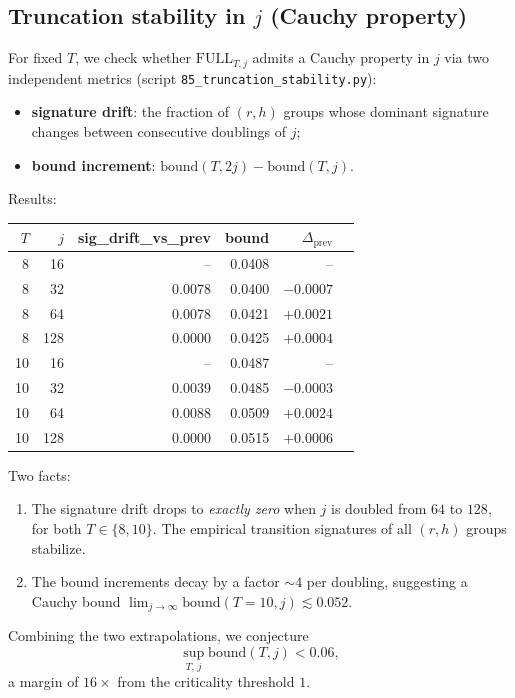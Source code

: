 \documentclass[11pt,a4paper]{article}
\theoremstyle{definition}
\newcommand{\full}{\mathrm{FULL}}
\begin{document}
\subsection{Truncation stability in $j$ (Cauchy property)}

For fixed $T$, we check whether $\full_{T, j}$ admits a Cauchy
property in $j$ via two independent metrics
(script \verb|85_truncation_stability.py|):
\begin{itemize}
  \item \textbf{signature drift}: the fraction of $(r, h)$ groups
        whose dominant signature changes between consecutive
        doublings of $j$;
  \item \textbf{bound increment}: $\mathrm{bound}(T, 2j) - \mathrm{bound}(T, j)$.
\end{itemize}

Results:

\begin{center}
\begin{tabular}{rrrrrr}
\toprule
$T$ & $j$ & sig\_drift\_vs\_prev & bound & $\Delta_{\mathrm{prev}}$ \\
\midrule
 8 & 16  & --     & 0.0408 & --      \\
 8 & 32  & 0.0078 & 0.0400 & $-0.0007$ \\
 8 & 64  & 0.0078 & 0.0421 & $+0.0021$ \\
 8 & 128 & 0.0000 & 0.0425 & $+0.0004$ \\
\midrule
10 & 16  & --     & 0.0487 & --      \\
10 & 32  & 0.0039 & 0.0485 & $-0.0003$ \\
10 & 64  & 0.0088 & 0.0509 & $+0.0024$ \\
10 & 128 & 0.0000 & 0.0515 & $+0.0006$ \\
\bottomrule
\end{tabular}
\end{center}

Two facts:
\begin{enumerate}
  \item The signature drift drops to \emph{exactly zero} when $j$ is
        doubled from $64$ to $128$, for both $T \in \{8, 10\}$. The
        empirical transition signatures of all $(r, h)$ groups
        stabilize.
  \item The bound increments decay by a factor $\sim 4$ per
        doubling, suggesting a Cauchy bound
        $\lim_{j\to\infty}\mathrm{bound}(T=10, j) \lesssim 0.052$.
\end{enumerate}
Combining the two extrapolations, we conjecture
\[
\sup_{T,\, j} \mathrm{bound}(T, j) < 0.06,
\]
a margin of $16\times$ from the criticality threshold $1$.
\end{document}

